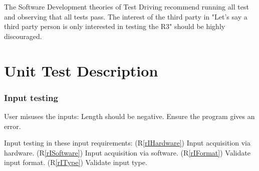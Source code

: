 \documentclass[12pt, titlepage]{article}
\newcommand{\rref}[1]{(R\ref{#1})}
\begin{document}
The Software Development theories of Test Driving recommend running all test and observing that all tests pass. The interest of the third party in "Let’s say a third party person is only interested in testing the R3" should be highly discouraged.

\section{Unit Test Description}

\subsubsection{Input testing}

User misuses the inputs: Length should be negative. Ensure the program gives an error.

Input testing in these input requirements:
\rref{rIHardware} Input acquisition via hardware.
\rref{rISoftware} Input acquisition via software.
\rref{rIFormat} Validate input format.
\rref{rIType} Validate input type.
\end{document}
